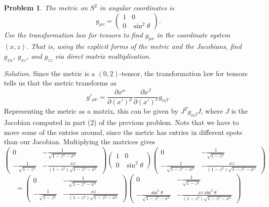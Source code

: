 \documentclass[11pt, letterpaper]{article}
\theoremstyle{plain}
\newtheorem{problem}{Problem}[section]
\begin{document}
\begin{problem}
	The metric on $S^2$ in angular coordinates is
	\[
		g_{\mu \nu } =\begin{pmatrix}
		1 & 0 \\
		0 & \sin ^2\theta 
		\end{pmatrix}
	.\]
	Use the transformation law for tensors to find $g_{\mu \nu } $ in the coordinate system $(x,z)$. That is, using the explicit forms of the metric and the Jacobians, find $g_{xx} $, $g_{xz} $, and $g_{zz} $ via direct matrix multiplication.
\end{problem}
\noindent\emph{Solution.} Since the metric is a $(0,2)$-tensor, the transformation law for tensors tells us that the metric transforms as
\[
	g'_{\mu \nu } =\frac{\partial x^\alpha }{\partial (x')^\mu  } \frac{\partial x^\beta }{\partial (x')^\nu } g_{\alpha \beta } 
.\]
Representing the metric as a matrix, this can be given by $J^Tg_{\alpha \beta } J$, where $J$ is the Jacobian computed in part (2) of the previous problem. Note that we have to move some of the entries around, since the metric has entries in different spots than our Jacobian. Multiplying the matrices gives
\[
	\begin{pmatrix}
		0&\displaystyle{-\frac{1}{\sqrt{1-z^2-x^2} }}  \\
		\displaystyle{-\frac{1}{\sqrt{1-z^2} } }&\displaystyle{-\frac{xz}{\left( 1-z^2 \right) \sqrt{1-z^2-x^2 }} } \end{pmatrix}\begin{pmatrix}
		1 & 0 \\
		0 & \sin ^2\theta 
		\end{pmatrix}\begin{pmatrix}
		0 & \displaystyle{-\frac{1}{\sqrt{1-z^2} } }\\
		\displaystyle{-\frac{1}{\sqrt{1-z^2-x^2} }}   & \displaystyle{-\frac{xz}{\left( 1-z^2 \right) \sqrt{1-z^2-x^2 }} }  
	\end{pmatrix}
\]
\[
	=\begin{pmatrix}
		0&\displaystyle{-\frac{1}{\sqrt{1-z^2-x^2} }}  \\
		\displaystyle{-\frac{1}{\sqrt{1-z^2} } }&\displaystyle{-\frac{xz}{\left( 1-z^2 \right) \sqrt{1-z^2-x^2 }} } \end{pmatrix}\begin{pmatrix}
		0 & \displaystyle{-\frac{1}{\sqrt{1-z^2} } } \\
		\displaystyle{-\frac{\sin ^2\theta }{\sqrt{1-z^2-x^2} }} & \displaystyle{-\frac{xz \sin ^2\theta }{\left( 1-z^2 \right) \sqrt{1-z^2-x^2 }} }
		\end{pmatrix}
\]
\end{document}
